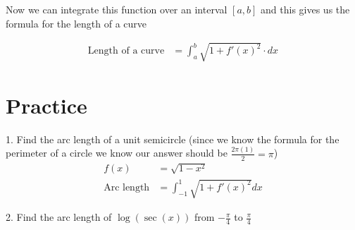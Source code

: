 \documentclass[12pt, letterpaper]{article}
\begin{document}
Now we can integrate this function over an interval $[a, b]$ and this gives us the formula for the length of a curve

\begin{align}
    \text{Length of a curve} &= \int_{a}^{b} \sqrt{1 + f'(x)^2} \cdot dx
\end{align}

\section{Practice}
1. Find the arc length of a unit semicircle (since we know the formula for the perimeter of a circle we know our answer should be $\frac{2\pi (1)}{2} = \pi$)
\begin{align}
    f(x) &= \sqrt{1-x^2} \\
    \text{Arc length} &= \int_{-1}^{1} \sqrt{1 + f'(x)^2} dx 
\end{align}

2. Find the arc length of $\log(\sec(x))$ from $-\frac{\pi}{4}$ to $\frac{\pi}{4}$
\end{document}
